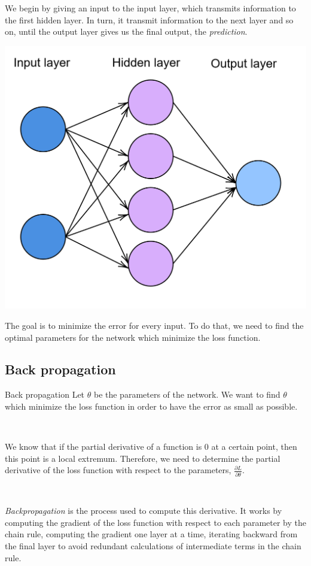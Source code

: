 \documentclass[11pt]{beamer}
\begin{document}
\begin{frame}
We begin by giving an input to the input layer, which transmits information to the first hidden layer. In turn, it transmit information to the next layer and so on, until the output layer gives us the final output, the \textit{prediction}.

\begin{center}
\includegraphics[scale=0.14]{nn.png}
\end{center}


The goal is to minimize the error for every input. To do that, we need to find the optimal parameters for the network which minimize the loss function.
\end{frame}

\subsection{Back propagation}
\begin{frame}{Back propagation}
Let $\theta$ be the parameters of the network. We want to find $\theta$ which minimize the loss function in order to have the error as small as possible. 

~

We know that if the partial derivative of a function is $0$ at a certain point, then this point is a local extremum. Therefore, we need to determine the partial derivative of the loss function with respect to the parameters, $\frac{\partial L}{\partial \theta}$.

~

\textit{Backpropagation} \cite{11} is the process used to compute this derivative. It works by computing the gradient of the loss function with respect to each parameter by the chain rule, computing the gradient one layer at a time, iterating backward from the final layer to avoid redundant calculations of intermediate terms in the chain rule.
\end{frame}
\end{document}
